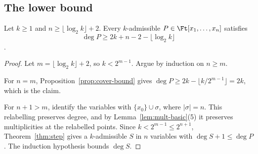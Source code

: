\subsection{The lower bound}

\begin{theorem}\label{thm:lower}
Let \(k\ge1\) and \(n\ge\lfloor\log_2k\rfloor+2\). Every \(k\)-admissible
\(P\in\Ft[x_1,\ldots,x_n]\) satisfies
\[
 \deg P\ge2k+n-2-\lfloor\log_2k\rfloor
\]
.
\end{theorem}

\begin{proof}
Let \(m=\lfloor\log_2k\rfloor+2\), so \(k<2^{m-1}\). Argue by induction on \(n\ge m\).

For \(n=m\), Proposition~\ref{prop:cover-bound} gives
\(\deg P\ge2k-\lfloor k/2^{m-1}\rfloor=2k\), which is the claim.

For \(n+1>m\), identify the variables with \(\{x_0\}\cup\sigma\), where \(|\sigma|=n\).
This relabelling preserves degree, and by Lemma~\ref{lem:mult-basic}(5) it
preserves multiplicities at the relabelled points. Since
\(k<2^{m-1}\le2^{n+1}\), Theorem~\ref{thm:step} gives a \(k\)-admissible \(S\) in
\(n\) variables with \(\deg S+1\le\deg P\). The induction hypothesis bounds
\(\deg S\).
\end{proof}

